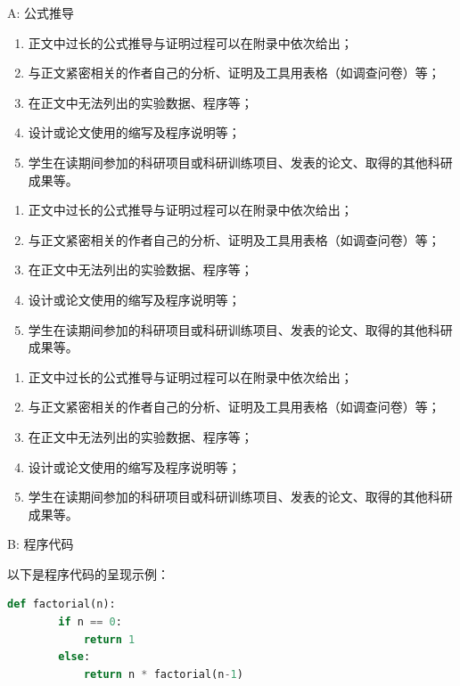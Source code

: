 \documentclass{document}
\begin{document}
\begin{cquappendix}{A: 公式推导}
    \begin{enumerate}
        \item 正文中过长的公式推导与证明过程可以在附录中依次给出；
        \item 与正文紧密相关的作者自己的分析、证明及工具用表格（如调查问卷）等；
        \item 在正文中无法列出的实验数据、程序等；
        \item 设计或论文使用的缩写及程序说明等；
        \item 学生在读期间参加的科研项目或科研训练项目、发表的论文、取得的其他科研成果等。
    \end{enumerate}

    \begin{enumerate}
        \item 正文中过长的公式推导与证明过程可以在附录中依次给出；
        \item 与正文紧密相关的作者自己的分析、证明及工具用表格（如调查问卷）等；
        \item 在正文中无法列出的实验数据、程序等；
        \item 设计或论文使用的缩写及程序说明等；
        \item 学生在读期间参加的科研项目或科研训练项目、发表的论文、取得的其他科研成果等。
    \end{enumerate}

    \begin{enumerate}
        \item 正文中过长的公式推导与证明过程可以在附录中依次给出；
        \item 与正文紧密相关的作者自己的分析、证明及工具用表格（如调查问卷）等；
        \item 在正文中无法列出的实验数据、程序等；
        \item 设计或论文使用的缩写及程序说明等；
        \item 学生在读期间参加的科研项目或科研训练项目、发表的论文、取得的其他科研成果等。
    \end{enumerate}
\end{cquappendix}

\begin{cquappendix}{B: 程序代码}
    
    以下是程序代码的呈现示例：
    
    \begin{lstlisting}[language=Python, caption={Python 示例代码}]
    def factorial(n):
        if n == 0:
            return 1
        else:
            return n * factorial(n-1)
    \end{lstlisting}
    
\end{cquappendix}
\end{document}
